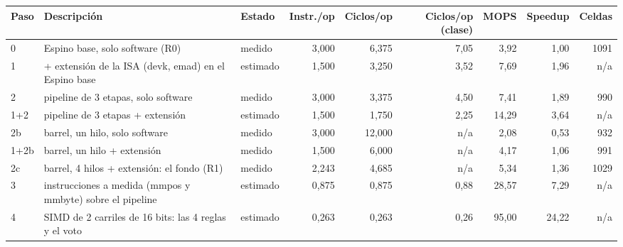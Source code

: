 \begin{tabular}{llp{1.5cm}rrrrrr}
\toprule
Paso & Descripción & Estado & Instr./op & Ciclos/op & Ciclos/op (clase) & MOPS & Speedup & Celdas \\
\midrule
0 & Espino base, solo software (R0) & medido & 3{,}000 & 6{,}375 & 7{,}05 & 3{,}92 & 1{,}00 & 1091 \\
1 & + extensión de la ISA (devk, emad) en el Espino base & estimado & 1{,}500 & 3{,}250 & 3{,}52 & 7{,}69 & 1{,}96 & n/a \\
2 & pipeline de 3 etapas, solo software & medido & 3{,}000 & 3{,}375 & 4{,}50 & 7{,}41 & 1{,}89 & 990 \\
1+2 & pipeline de 3 etapas + extensión & estimado & 1{,}500 & 1{,}750 & 2{,}25 & 14{,}29 & 3{,}64 & n/a \\
2b & barrel, un hilo, solo software & medido & 3{,}000 & 12{,}000 & n/a & 2{,}08 & 0{,}53 & 932 \\
1+2b & barrel, un hilo + extensión & medido & 1{,}500 & 6{,}000 & n/a & 4{,}17 & 1{,}06 & 991 \\
2c & barrel, 4 hilos + extensión: el fondo (R1) & medido & 2{,}243 & 4{,}685 & n/a & 5{,}34 & 1{,}36 & 1029 \\
3 & instrucciones a medida (mmpos y mmbyte) sobre el pipeline & estimado & 0{,}875 & 0{,}875 & 0{,}88 & 28{,}57 & 7{,}29 & n/a \\
4 & SIMD de 2 carriles de 16 bits: las 4 reglas y el voto & estimado & 0{,}263 & 0{,}263 & 0{,}26 & 95{,}00 & 24{,}22 & n/a \\
\bottomrule
\end{tabular}
\par{}

